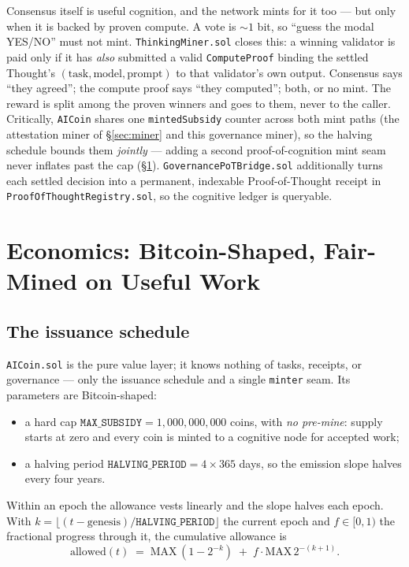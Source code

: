 \documentclass[11pt,a4paper]{article}
\begin{document}
Consensus itself is useful cognition, and the network mints for it too --- but only when it is backed by proven compute. A vote is $\sim\!1$ bit, so ``guess the modal YES/NO'' must not mint. \texttt{ThinkingMiner.sol} closes this: a winning validator is paid only if it has \emph{also} submitted a valid \texttt{ComputeProof} binding the settled Thought's $(\text{task},\text{model},\text{prompt})$ to that validator's own output. Consensus says ``they agreed''; the compute proof says ``they computed''; both, or no mint. The reward is split among the proven winners and goes to them, never to the caller. Critically, \texttt{AICoin} shares one \texttt{mintedSubsidy} counter across both mint paths (the attestation miner of \S\ref{sec:miner} and this governance miner), so the halving schedule bounds them \emph{jointly} --- adding a second proof-of-cognition mint seam never inflates past the cap (\S\ref{sec:economics}). \texttt{GovernancePoTBridge.sol} additionally turns each settled decision into a permanent, indexable Proof-of-Thought receipt in \texttt{ProofOfThoughtRegistry.sol}, so the cognitive ledger is queryable.

\section{Economics: Bitcoin-Shaped, Fair-Mined on Useful Work}\label{sec:economics}

\subsection{The issuance schedule}

\texttt{AICoin.sol} is the pure value layer; it knows nothing of tasks, receipts, or governance --- only the issuance schedule and a single \texttt{minter} seam. Its parameters are Bitcoin-shaped:
\begin{itemize}
  \item a hard cap $\texttt{MAX\_SUBSIDY} = 1{,}000{,}000{,}000$ coins, with \emph{no pre-mine}: supply starts at zero and every coin is minted to a cognitive node for accepted work;
  \item a halving period $\texttt{HALVING\_PERIOD} = 4 \times 365$ days, so the emission slope halves every four years.
\end{itemize}
Within an epoch the allowance vests linearly and the slope halves each epoch. With $k = \lfloor (t - \text{genesis})/\texttt{HALVING\_PERIOD} \rfloor$ the current epoch and $f \in [0,1)$ the fractional progress through it, the cumulative allowance is
\begin{equation}\label{eq:allowed}
  \text{allowed}(t) \;=\; \text{MAX}\,(1 - 2^{-k}) \;+\; f \cdot \text{MAX}\, 2^{-(k+1)} .
\end{equation}
\end{document}
